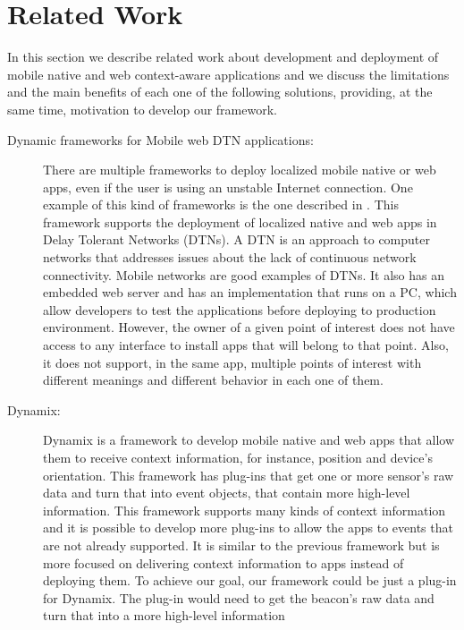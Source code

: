 
%
%

\section{Related Work}
\label{sec:related_work}
In this section we describe related work about
development and deployment of mobile native and web 
context-aware applications and we discuss the 
limitations and the main benefits of each one of
the following solutions, providing, at the same time,
motivation to develop our framework.
\begin{description}
  \item[Dynamic frameworks for Mobile web DTN applications:]
  There are multiple frameworks to deploy localized
  mobile native or web apps, even if the user is using an
  unstable Internet connection. One example of this
  kind of frameworks is the one
  described in \cite{Sankaran2014}.
  This framework supports the deployment of localized 
  native and
  web apps in Delay Tolerant Networks (DTNs).
  A DTN is an approach to computer networks that 
  addresses issues about the lack of continuous network
  connectivity. Mobile networks are good examples of DTNs. 
  It also has an embedded web server 
  and has an implementation that runs on a PC, which allow
  developers to test the applications before deploying
  to production environment.
  However, the owner of a given point of interest does not
  have access to any interface to install apps that will
  belong to that point. Also, it does not support, in the
  same app, multiple points of interest with different
  meanings and different behavior in each one of them. 
  \item[Dynamix:]
  Dynamix \cite{Carlson2012} is a framework to develop
  mobile native and web apps that allow them to receive
  context information, for instance, position and device's
  orientation. This framework has plug-ins that get
  one or more sensor's raw data and turn that into event
  objects, that contain more high-level information.
  This framework supports many kinds of context information
  and it is possible to develop more plug-ins to allow the
  apps to events that are not
  already supported. It is similar to the previous
  framework but is more focused on delivering context
  information to apps instead of deploying them.
  To achieve our goal, our framework could be just a
  plug-in for Dynamix. The plug-in would
  need to get the beacon's raw data and
  turn that into a more high-level information 

\end{description}
